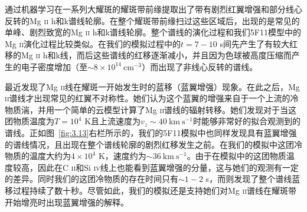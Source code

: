 \textcites{Panos2018}通过机器学习在一系列大耀斑的耀斑带前缘提取出了带有剧烈红翼增强和部分线心反转的Mg \textsc{ii} h和k谱线轮廓。在整个耀斑带前缘扫过这些区域后，出现的是常见的单峰、剧烈致宽的Mg \textsc{ii} h和k谱线轮廓。整个谱线的演化过程和我们5F11模型中的Mg \textsc{ii}演化过程比较类似。在我们的模拟过程中的$t=7-10$ s间先产生了有较大红移的Mg \textsc{ii} h和k线，而后这些谱线的红移逐渐减小，并且因为色球被高度压缩而产生的电子密度增加（至$\sim 8\times 10^{14}\ \mathrm{cm^{-3}}$）而出现了非线心反转的谱线。

最近\textcites{Tei2018}发现了Mg \textsc{ii}线在耀斑一开始发生时的蓝移（蓝翼增强）现象。在此之后，Mg \textsc{ii}谱线才出现常见的红翼不对称性。她们认为这个蓝翼的增强来自于一个上流的冷物质湍，并用一个简单的云模型计算了Mg \textsc{ii}谱线的辐射转移。她们发现对于当这团物质温度为$T=10^4$ K且上流速度为$v_z\sim 40\ \mathrm{km \  s^{-1}}$时能够非常好的拟合观测到的谱线。正如图~\ref{fig:3.13}右栏所示的，我们的5F11模拟中也同样发现具有蓝翼增强的谱线情况，且出现在整个谱线轮廓的剧烈红移发生之前。在我们的模拟中这团冷物质的温度大约为$4\times 10^4$ K，速度约为$\sim 36\ \mathrm{km \  s^{-1}}$。由于在模拟中的这团物质温度较高，因此在C \textsc{ii}和Si \textsc{iv}线上也能看到蓝翼增强的分量，这与她们的观测有一定的差异。同时我们的这团冷物质的存在时间只有$\sim 1-2$ s，而\textcites{Tei2018}则发现了整个谱线蓝移过程持续了数十秒。尽管如此，我们的模拟还是支持她们对Mg \textsc{ii}谱线在耀斑带开始增亮时出现蓝翼增强的解释。


